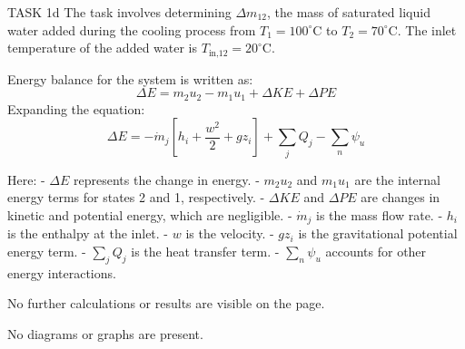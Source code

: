TASK 1d  
The task involves determining \( \Delta m_{12} \), the mass of saturated liquid water added during the cooling process from \( T_1 = 100^\circ\text{C} \) to \( T_2 = 70^\circ\text{C} \). The inlet temperature of the added water is \( T_{\text{in,12}} = 20^\circ\text{C} \).

Energy balance for the system is written as:  
\[
\Delta E = m_2 u_2 - m_1 u_1 + \Delta KE + \Delta PE
\]  
Expanding the equation:  
\[
\Delta E = -\dot{m}_j \left[ h_i + \frac{w^2}{2} + g z_i \right] + \sum_j Q_j - \sum_n \psi_u
\]  

Here:  
- \( \Delta E \) represents the change in energy.  
- \( m_2 u_2 \) and \( m_1 u_1 \) are the internal energy terms for states 2 and 1, respectively.  
- \( \Delta KE \) and \( \Delta PE \) are changes in kinetic and potential energy, which are negligible.  
- \( \dot{m}_j \) is the mass flow rate.  
- \( h_i \) is the enthalpy at the inlet.  
- \( w \) is the velocity.  
- \( g z_i \) is the gravitational potential energy term.  
- \( \sum_j Q_j \) is the heat transfer term.  
- \( \sum_n \psi_u \) accounts for other energy interactions.  

No further calculations or results are visible on the page.  

No diagrams or graphs are present.